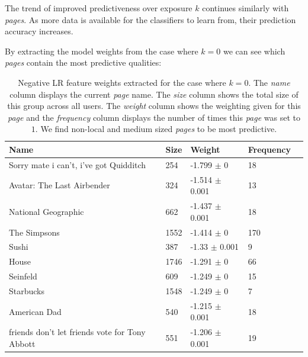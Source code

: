 The trend of improved predictiveness over exposure $k$ continues similarly with \emph{pages}. As more data is available for the 
classifiers to learn from, their prediction accuracy increases.

\clearpage

By extracting the model weights from the case where $k=0$ we can see which \emph{pages} contain the most predictive qualities:
\begin{table}[h]
\begin{minipage}[b]{1.0\textwidth}
\centering
  \begin{tabular}{|l|l|l|l|l|} %
  \hline
  \textbf{Name} & \textbf{Size} & \textbf{Weight} & \textbf{Frequency} \\ \hline
\small{Sorry mate i can't, i've got Quidditch}  & 254 & -1.799 $\pm$ 0 & 18 \\ \hline
\small{Avatar: The Last Airbender}  & 324 & -1.514 $\pm$ 0.001 & 13 \\ \hline
\small{National Geographic}  & 662 & -1.437 $\pm$ 0.001 & 18 \\ \hline
\small{The Simpsons}  & 1552 & -1.414 $\pm$ 0 & 170 \\ \hline
\small{Sushi}  & 387 & -1.33 $\pm$ 0.001 & 9 \\ \hline
\small{House}  & 1746 & -1.291 $\pm$ 0 & 66 \\ \hline
\small{Seinfeld}  & 609 & -1.249 $\pm$ 0 & 15 \\ \hline
\small{Starbucks}  & 1548 & -1.249 $\pm$ 0 & 7 \\ \hline
\small{American Dad}  & 540 & -1.215 $\pm$ 0.001 & 18 \\ \hline
\small{friends don't let friends vote for Tony Abbott}  & 551 & -1.206 $\pm$ 0.001 & 19 \\ \hline
  \end{tabular}
 \caption{Negative LR feature weights extracted for the case where $k=0$. The \emph{name} column displays the current \emph{page} name.
  The \emph{size} column shows the total size of this group across all users.
  The \emph{weight} column shows the weighting given for this \emph{page} and the \emph{frequency} column displays the number of times 
  this \emph{page} was set to $1$. We find non-local and medium sized \emph{pages} to be most predictive.}
\end{minipage}
\end{table}

